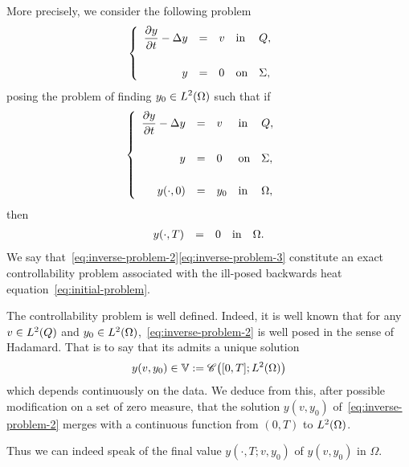 More precisely, we consider the following problem
\begin{equation*}\label{eq:inverse-problem-1}
    \begin{cases}\displaystyle
        \begin{array}{rclll}
            \dfrac{\partial{}y}{\partial{}t} - \Delta y & = & v & \text{in} & Q,\\
            \\
            y & = & 0 & \text{on} & \Sigma,
        \end{array}
    \end{cases}
\end{equation*}
posing the problem of finding $\displaystyle y_{0}\in L^{2}\!\left({\Omega}\right)$ such
that if
\begin{equation}\label{eq:inverse-problem-2}
    \begin{cases}\displaystyle
        \begin{array}{rclll}
            \dfrac{\partial{}y}{\partial{}t} - \Delta y & = & v & \text{in} & Q,\\
            \\
            y & = & 0 & \text{on} & \Sigma,\\
            \\
            {y}\!\left({\cdot, 0}\right) & = & y_{0} & \text{in} & \Omega,
        \end{array}
    \end{cases}
\end{equation}
then
\begin{equation}\label{eq:inverse-problem-3}
    \begin{array}{rclll}
        {y}\!\left({\cdot,T}\right) & = & 0 & \text{in} & \Omega.
    \end{array}
\end{equation}
We say that~\eqref{eq:inverse-problem-2}\eqref{eq:inverse-problem-3}
constitute an exact controllability problem associated with the ill-posed
backwards heat equation~\eqref{eq:initial-problem}.

\begin{remarque}%
    The controllability problem is well defined. Indeed, it is well known
    that for any $v\in L^{2}\!\left({Q}\right)$ and
    $y_{0}\in L^{2}\!\left({\Omega}\right)$,~\eqref{eq:inverse-problem-2} is well posed in
    the sense of Hadamard. That is to say that its admits a unique solution
    \begin{equation*}\label{eq:well-posedness-heat-equation}
        y\!\left({v,y_{0}}\right)\in \mathbb{V} :=
        \mathscr{C}\!\left({[0,T];L^{2}\!\left({\Omega}\right)}\right)
    \end{equation*}
    which depends continuously on the data. We deduce from this, after
    possible modification on a set of zero measure, that the solution
    $y\!\left({v,y_{0}}\right)$ of~\eqref{eq:inverse-problem-2} merges with
    a continuous function from $(0,T)$ to $L^{2}\!\left({\Omega}\right)$.

    Thus we can indeed speak of the final value
    $y\!\left({\cdot,T;v,y_{0}}\right)$ of $y\!\left({v,y_{0}}\right)$ in
    $\Omega$.
\end{remarque}

